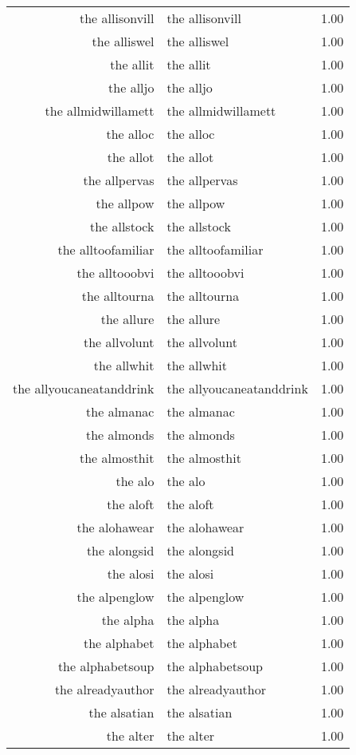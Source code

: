 \begin{table}[ht]
\begin{tabular}{rlr}
  the allisonvill & the allisonvill & 1.00 \\ 
  the alliswel & the alliswel & 1.00 \\ 
  the allit & the allit & 1.00 \\ 
  the alljo & the alljo & 1.00 \\ 
  the allmidwillamett & the allmidwillamett & 1.00 \\ 
  the alloc & the alloc & 1.00 \\ 
  the allot & the allot & 1.00 \\ 
  the allpervas & the allpervas & 1.00 \\ 
  the allpow & the allpow & 1.00 \\ 
  the allstock & the allstock & 1.00 \\ 
  the alltoofamiliar & the alltoofamiliar & 1.00 \\ 
  the alltooobvi & the alltooobvi & 1.00 \\ 
  the alltourna & the alltourna & 1.00 \\ 
  the allure & the allure & 1.00 \\ 
  the allvolunt & the allvolunt & 1.00 \\ 
  the allwhit & the allwhit & 1.00 \\ 
  the allyoucaneatanddrink & the allyoucaneatanddrink & 1.00 \\ 
  the almanac & the almanac & 1.00 \\ 
  the almonds & the almonds & 1.00 \\ 
  the almosthit & the almosthit & 1.00 \\ 
  the alo & the alo & 1.00 \\ 
  the aloft & the aloft & 1.00 \\ 
  the alohawear & the alohawear & 1.00 \\ 
  the alongsid & the alongsid & 1.00 \\ 
  the alosi & the alosi & 1.00 \\ 
  the alpenglow & the alpenglow & 1.00 \\ 
  the alpha & the alpha & 1.00 \\ 
  the alphabet & the alphabet & 1.00 \\ 
  the alphabetsoup & the alphabetsoup & 1.00 \\ 
  the alreadyauthor & the alreadyauthor & 1.00 \\ 
  the alsatian & the alsatian & 1.00 \\ 
  the alter & the alter & 1.00 \\ 

\end{tabular}
\end{table}
